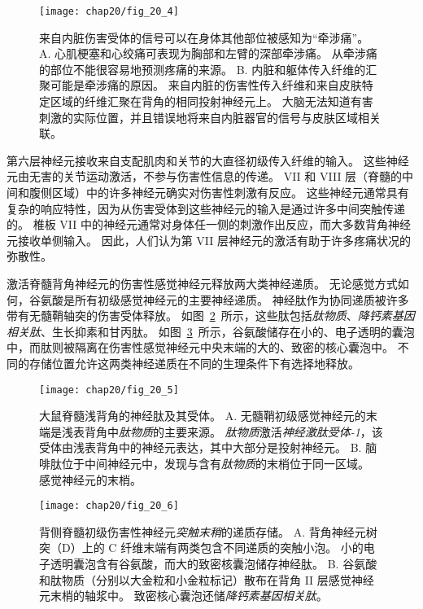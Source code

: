 \begin{figure}[htbp]
	\centering
	\texttt{[image: chap20/fig\_20\_4]}
	\caption{来自内脏伤害受体的信号可以在身体其他部位被感知为“牵涉痛”。
		A. 心肌梗塞和心绞痛可表现为胸部和左臂的深部牵涉痛。
		从牵涉痛的部位不能很容易地预测疼痛的来源。
		B. 内脏和躯体传入纤维的汇聚可能是牵涉痛的原因。
		来自内脏的伤害性传入纤维和来自皮肤特定区域的纤维汇聚在背角的相同投射神经元上。
		大脑无法知道有害刺激的实际位置，并且错误地将来自内脏器官的信号与皮肤区域相关联\cite{fields1987painful}。}
	\label{fig:20_4}
\end{figure}


第六层神经元接收来自支配肌肉和关节的大直径初级传入纤维的输入。
这些神经元由无害的关节运动激活，不参与伤害性信息的传递。
VII 和 VIII 层（脊髓的中间和腹侧区域）中的许多神经元确实对伤害性刺激有反应。
这些神经元通常具有复杂的响应特性，因为从伤害受体到这些神经元的输入是通过许多中间突触传递的。
椎板 VII 中的神经元通常对身体任一侧的刺激作出反应，而大多数背角神经元接收单侧输入。
因此，人们认为第 VII 层神经元的激活有助于许多疼痛状况的弥散性。


激活脊髓背角神经元的伤害性感觉神经元释放两大类神经递质。
无论感觉方式如何，谷氨酸是所有初级感觉神经元的主要神经递质。
神经肽作为协同递质被许多带有无髓鞘轴突的伤害受体释放。
如图~\ref{fig:20_5}~所示，这些肽包括\textit{肽物质}、\textit{降钙素基因相关肽}、生长抑素和甘丙肽。
如图~\ref{fig:20_6}~所示，谷氨酸储存在小的、电子透明的囊泡中，而肽则被隔离在伤害性感觉神经元中央末端的大的、致密的核心囊泡中。
不同的存储位置允许这两类神经递质在不同的生理条件下有选择地释放。


\begin{figure}[htbp]
	\centering
	\texttt{[image: chap20/fig\_20\_5]}
	\caption{大鼠脊髓浅背角的神经肽及其受体。
		A. 无髓鞘初级感觉神经元的末端是浅表背角中\textit{肽物质}的主要来源。
		\textit{肽物质}激活\textit{神经激肽受体-1}，该受体由浅表背角中的神经元表达，其中大部分是投射神经元。
		B. 脑啡肽位于中间神经元中，发现与含有\textit{肽物质}的末梢位于同一区域。
		感觉神经元的末梢。}
	\label{fig:20_5}
\end{figure}


\begin{figure}[htbp]
	\centering
	\texttt{[image: chap20/fig\_20\_6]}
	\caption{背侧脊髓初级伤害性神经元\textit{突触末稍}的递质存储。
		A. 背角神经元树突（D）上的 C 纤维末端有两类包含不同递质的突触小泡。
		小的电子透明囊泡含有谷氨酸，而大的致密核囊泡储存神经肽。
		B. 谷氨酸和肽物质（分别以大金粒和小金粒标记）散布在背角 II 层感觉神经元末梢的轴浆中。
		致密核心囊泡还储\textit{降钙素基因相关肽}\cite{de1990ultrastructural}。}
	\label{fig:20_6}
\end{figure}


